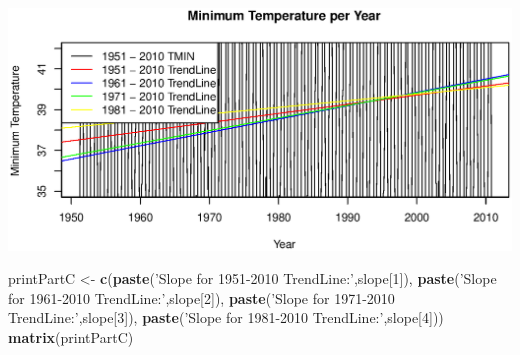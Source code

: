 \documentclass[
]{article}
\newenvironment{Shaded}{\begin{snugshade}}{\end{snugshade}}
\newcommand{\DecValTok}[1]{\textcolor[rgb]{0.00,0.00,0.81}{#1}}
\newcommand{\KeywordTok}[1]{\textcolor[rgb]{0.13,0.29,0.53}{\textbf{#1}}}
\newcommand{\NormalTok}[1]{#1}
\newcommand{\StringTok}[1]{\textcolor[rgb]{0.31,0.60,0.02}{#1}}
\begin{document}
\includegraphics{Figures/Prob9}

\begin{Shaded}
\begin{Highlighting}[]
\NormalTok{printPartC <-}\StringTok{ }\KeywordTok{c}\NormalTok{(}\KeywordTok{paste}\NormalTok{(}\StringTok{'Slope for 1951-2010 TrendLine:'}\NormalTok{,slope[}\DecValTok{1}\NormalTok{]), }
                \KeywordTok{paste}\NormalTok{(}\StringTok{'Slope for 1961-2010 TrendLine:'}\NormalTok{,slope[}\DecValTok{2}\NormalTok{]), }
                \KeywordTok{paste}\NormalTok{(}\StringTok{'Slope for 1971-2010 TrendLine:'}\NormalTok{,slope[}\DecValTok{3}\NormalTok{]), }
                \KeywordTok{paste}\NormalTok{(}\StringTok{'Slope for 1981-2010 TrendLine:'}\NormalTok{,slope[}\DecValTok{4}\NormalTok{]))}
\KeywordTok{matrix}\NormalTok{(printPartC)}
\end{Highlighting}
\end{Shaded}
\end{document}
